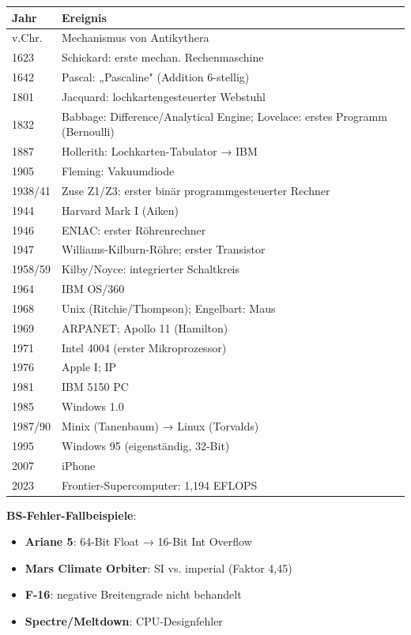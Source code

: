 \documentclass[11pt, a4paper]{article}
\begin{document}
{\small
\begin{tabularx}{\linewidth}{XX}
\hline
\rowcolor{tableheadbg}
{\color{white}\textbf{Jahr}} & {\color{white}\textbf{Ereignis}} \\[2pt]
\hline
\endhead
\hline
\endfoot
70 v.Chr. & Mechanismus von Antikythera \\
1623 & Schickard: erste mechan. Rechenmaschine \\
1642 & Pascal: „Pascaline" (Addition 6-stellig) \\
1801 & Jacquard: lochkartengesteuerter Webstuhl \\
1832 & Babbage: Difference/Analytical Engine; Lovelace: erstes Programm (Bernoulli) \\
1887 & Hollerith: Lochkarten-Tabulator → IBM \\
1905 & Fleming: Vakuumdiode \\
1938/41 & Zuse Z1/Z3: erster binär programmgesteuerter Rechner \\
1944 & Harvard Mark I (Aiken) \\
1946 & ENIAC: erster Röhrenrechner \\
1947 & Williams-Kilburn-Röhre; erster Transistor \\
1958/59 & Kilby/Noyce: integrierter Schaltkreis \\
1964 & IBM OS/360 \\
1968 & Unix (Ritchie/Thompson); Engelbart: Maus \\
1969 & ARPANET; Apollo 11 (Hamilton) \\
1971 & Intel 4004 (erster Mikroprozessor) \\
1976 & Apple I; IP \\
1981 & IBM 5150 PC \\
1985 & Windows 1.0 \\
1987/90 & Minix (Tanenbaum) → Linux (Torvalds) \\
1995 & Windows 95 (eigenständig, 32-Bit) \\
2007 & iPhone \\
2023 & Frontier-Supercomputer: 1,194 EFLOPS \\
\end{tabularx}
}


\textbf{BS-Fehler-Fallbeispiele}:

\begin{itemize}
  \item \textbf{Ariane 5}: 64-Bit Float → 16-Bit Int Overflow
  \item \textbf{Mars Climate Orbiter}: SI vs. imperial (Faktor 4,45)
  \item \textbf{F-16}: negative Breitengrade nicht behandelt
  \item \textbf{Spectre/Meltdown}: CPU-Designfehler
\end{itemize}
\end{document}
